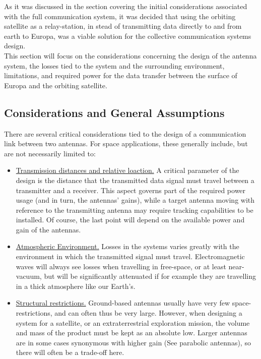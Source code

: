 %       

As it was discussed in the section covering the initial considerations associated with the full communication system, it was decided that using the orbiting satellite as a relay-station, in stead of transmitting data directly to and from earth to Europa, was a viable solution for the collective communication systems design.\\
This section will focus on the considerations concerning the design of the antenna system, the losses tied to the system and the surrounding environment, limitations, and required power for the data transfer between the surface of Europa and the orbiting satellite.

\subsection{Considerations and General Assumptions}
There are several critical considerations tied to the design of a communication link between two antennas. For space applications, these generally include, but are not necessarily limited to:

\begin{itemize}
\item \underline{Transmission distances and relative loaction.} A critical parameter of the design is the distance that the transmitted data signal must travel between a transmitter and a receiver. This aspect governs part of the required power usage (and in turn, the antennas' gains), while a target antenna moving with reference to the transmitting antenna may require tracking capabilities to be installed. Of course, the last point will depend on the available power and gain of the antennas.
\item \underline{Atmospheric Environment.} Losses in the systems varies greatly with the environment in which the transmitted signal must travel. Electromagnetic waves will always see losses when travelling in free-space, or at least near-vacuum, but will be significantly attenuated if for example they are travelling in a thick atmosphere like our Earth's.
\item \underline{Structural restrictions.} Ground-based antennas usually have very few space-restrictions, and can often thus be very large. However, when designing a system for a satellite, or an extraterrestrial exploration mission, the volume and mass of the product must be kept as an absolute low. Larger antennas are in some cases synonymous with higher gain (See parabolic antennas), so there will often be a trade-off here.
\end{itemize}

